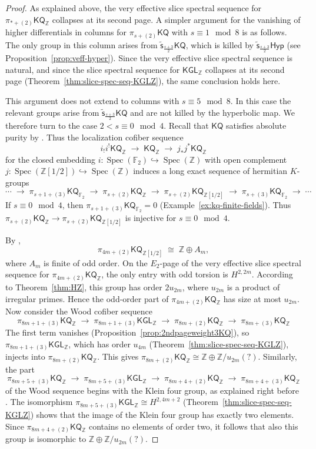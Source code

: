 \documentclass[11pt,hyp,english]{article}
\newcommand{\Z}{\mathbb{Z}}
\newcommand{\FF}{\mathbb{F}}
\newcommand{\KGL}{\mathsf{KGL}}
\newcommand{\KQ}{\mathsf{KQ}}
\newcommand{\Spec}{\operatorname{Spec}}
\newcommand{\vs}{\tilde{\mathsf{s}}}
\newcommand{\Hyper}{\mathsf{Hyp}}
\let\iso=\cong
\theoremstyle{definition}
\begin{document}
\begin{proof}
As explained above, the very effective slice spectral sequence for $\pi_{\ast+(2)}\KQ_\Z$ collapses at its second page. 
A simpler argument for the vanishing of higher differentials in columns for $\pi_{s+(2)}\KQ$ with $s \equiv 1 \mod{8}$ is as follows. 
The only group in this column arises from $\vs_{\frac{s+3}{2}}\KQ$, which is killed by $\vs_{\frac{s+3}{2}}\Hyper$ (see Proposition~\ref{prop:veff-hyper}). 
Since the very effective slice spectral sequence is natural, and since the slice spectral sequence for $\KGL_\Z$ collapses at its second page (Theorem~\ref{thm:slice-spec-seq-KGLZ}), the same conclusion holds here. 

This argument does not extend to columns with $s \equiv 5 \mod{8}$. 
In this case the relevant groups arise from $\vs_{\frac{s+3}{2}}\KQ$ and are not killed by the hyperbolic map. 
We therefore turn to the case $2 < s \equiv 0 \mod{4}$. 
Recall that $\KQ$ satisfies absolute purity by \cite[Theorem 8.4.2]{chn}. 
Thus the localization cofiber sequence 
\[
i_!i^!\KQ_\Z \;\longrightarrow\; \KQ_\Z \;\longrightarrow\; j_\ast j^\ast \KQ_\Z 
\]
for the closed embedding $ i \colon \Spec(\FF_{2}) \hookrightarrow \Spec(\Z)$
with open complement 
$j \colon \Spec(\Z[1/2]) \hookrightarrow \Spec(\Z)$
induces a long exact sequence of hermitian $K$-groups
\[
\dotsb \;\to\; \pi_{s+1+(3)}\KQ_{\FF_2}
  \;\to\; \pi_{s+(2)}\KQ_\Z
  \;\to\; \pi_{s+(2)}\KQ_{\Z[1/2]}
  \;\to\; \pi_{s+(3)}\KQ_{\FF_2}
  \;\to\; \dotsb 
\]
If $s \equiv 0 \mod{4}$, then $\pi_{s+1+(3)}\KQ_{\FF_2}=0$ (Example~\ref{ex:kq-finite-fields}). 
Thus $\pi_{s+(2)}\KQ_\Z \to \pi_{s+(2)}\KQ_{\Z[1/2]}$ is injective for $s \equiv 0 \mod{4}$. 

By \cite[Theorem B]{berrick-karoubi}, 
\[
\pi_{4m+(2)}\KQ_{\Z[1/2]} \;\cong\; \Z \oplus A_m,
\]
where $A_m$ is finite of odd order. 
On the $E_2$-page of the very effective slice spectral sequence for $\pi_{4m+(2)}\KQ_\Z$, the only entry with odd torsion is $H^{2,2m}$. 
According to Theorem~\ref{thm:HZ}, this group has order $2u_{2m}$, where $u_{2m}$ is a product of irregular primes. 
Hence the odd-order part of $\pi_{4m+(2)}\KQ_\Z$ has size at most $u_{2m}$. 
Now consider the Wood cofiber sequence
\[
\pi_{8m+1+(3)}\KQ_{\Z}
   \;\to\; \pi_{8m+1+(3)}\KGL_\Z
   \;\to\; \pi_{8m+(2)}\KQ_\Z
   \;\to\; \pi_{8m+(3)}\KQ_\Z 
\]
The first term vanishes (Proposition~\ref{prop:2ndpageweight3KQ}), so $\pi_{8m+1+(3)}\KGL_\Z$, which has order $u_{4m}$ (Theorem~\ref{thm:slice-spec-seq-KGLZ}), injects into $\pi_{8m+(2)}\KQ_\Z$.
This gives $\pi_{8m+(2)}\KQ_\Z\iso \Z\oplus \Z/u_{2m}(?)$. Similarly, the part
\[
\pi_{8m+5+(3)}\KQ_{\Z}
   \;\to\; \pi_{8m+5+(3)}\KGL_\Z
   \;\to\; \pi_{8m+4+(2)}\KQ_\Z
   \;\to\; \pi_{8m+4+(3)}\KQ_\Z
\]
of the Wood sequence begins with the Klein four group, as explained right before .  
The isomorphism $\pi_{8m+5+(3)}\KGL_\Z \cong H^{2,4m+2}$ (Theorem~\ref{thm:slice-spec-seq-KGLZ}) shows that the image of the Klein four group has exactly two elements. 
Since $\pi_{8m+4+(2)}\KQ_\Z$ contains no elements of order two, it follows that also this group is isomorphic to $\Z \oplus \Z/u_{2m}(?)$.
\end{proof}
\end{document}
